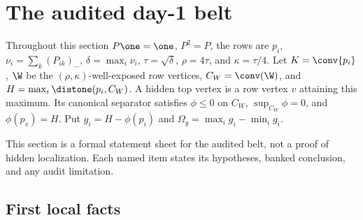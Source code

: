 \section{The audited day-1 belt}

Throughout this section \(P\one=\one\), \(P^2=P\), the rows are \(p_i\),
\(\nu_i=\sum_k(P_{ik})_-\), \(\delta=\max_i\nu_i\), \(\tau=\sqrt\delta\),
\(\rho=4\tau\), and \(\kappa=\tau/4\).  Let \(K=\conv\{p_i\}\),
\(\W\) be the \((\rho,\kappa)\)-well-exposed row vertices,
\(C_W=\conv(\W)\), and \(H=\max_i\distone(p_i,C_W)\).  A hidden top
vertex is a row vertex \(v\) attaining this maximum.  Its canonical
separator satisfies \(\phi\le 0\) on \(C_W\), \(\sup_{C_W}\phi=0\), and
\(\phi(p_v)=H\).  Put \(g_i=H-\phi(p_i)\) and
\(\Omega_g=\max_i g_i-\min_i g_i\).

This section is a formal statement sheet for the audited belt, not a
proof of hidden localization.  Each named item states its hypotheses,
banked conclusion, and any audit limitation.

\subsection{First local facts}

